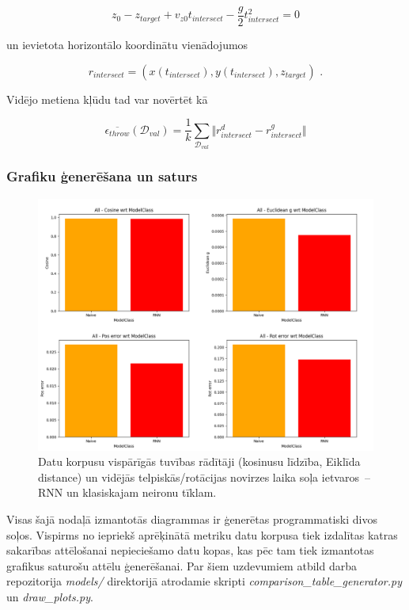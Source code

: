 \documentclass[12pt, a4paper]{article}
\numberwithin{equation}{section} %
\begin{document}
\begin{equation}
    z_0 - z_{target} + v_{z0}t_{intersect} - \frac{g}{2}t_{intersect}^2 = 0
\end{equation}

un ievietota horizontālo koordinātu vienādojumos

\begin{equation}
    r_{intersect} = \left ( x(t_{intersect}), y(t_{intersect}), z_{target} \right )
\text{ .}
\end{equation}

Vidējo metiena kļūdu tad var novērtēt kā

\begin{equation}
    \overline{\epsilon_{throw}}(\mathcal{D}_{val}) = \frac{1}{k} \sum_{\mathcal{D}_{val}}
    \Vert r^d_{intersect} - r^g_{intersect} \Vert 
\end{equation}


\subsubsection{Grafiku ģenerēšana un saturs}

\begin{figure}[t!]
    \centering
    \includegraphics[width=16cm,page=1]{../img/rnn-naive-global-stepwise.png}
    \caption{Datu korpusu vispārīgās tuvības rādītāji (kosinusu līdzība, Eiklīda distance) un vidējās telpiskās/rotācijas novirzes laika soļa ietvaros~-- RNN un klasiskajam neironu tīklam.}
    \label{all_global}
\end{figure}

Visas šajā nodaļā izmantotās diagrammas ir ģenerētas programmatiski divos soļos. Vispirms no iepriekš aprēķinātā metriku datu korpusa tiek izdalītas katras sakarības attēlošanai nepieciešamo datu kopas, kas pēc tam tiek izmantotas grafikus saturošu attēlu ģenerēšanai. Par šiem uzdevumiem atbild darba repozitorija \cite{md_repo} \textit{models/} direktorijā atrodamie skripti \textit{comparison\_table\_generator.py} un \textit{draw\_plots.py}.
\end{document}
